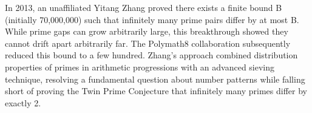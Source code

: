 In 2013, an unaffiliated Yitang Zhang proved there exists a finite bound B (initially 70,000,000) such that infinitely many prime pairs differ by at most B. While prime gaps can grow arbitrarily large, this breakthrough showed they cannot drift apart arbitrarily far. The Polymath8 collaboration subsequently reduced this bound to a few hundred. Zhang's approach combined distribution properties of primes in arithmetic progressions with an advanced sieving technique, resolving a fundamental question about number patterns while falling short of proving the Twin Prime Conjecture that infinitely many primes differ by exactly 2.
